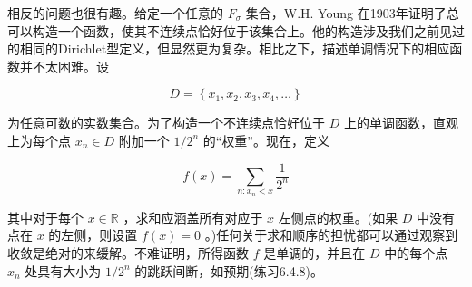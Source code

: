 相反的问题也很有趣。给定一个任意的 \({F}_{\sigma }\) 集合，W.H. Young 在1903年证明了总可以构造一个函数，使其不连续点恰好位于该集合上。他的构造涉及我们之前见过的相同的Dirichlet型定义，但显然更为复杂。相比之下，描述单调情况下的相应函数并不太困难。设

\[
D = \left\{  {{x}_{1},{x}_{2},{x}_{3},{x}_{4},\ldots }\right\}
\]

为任意可数的实数集合。为了构造一个不连续点恰好位于 \(D\) 上的单调函数，直观上为每个点 \({x}_{n} \in  D\) 附加一个 \(1/{2}^{n}\) 的“权重”。现在，定义

\[
f\left( x\right)  = \mathop{\sum }\limits_{{n : {x}_{n} < x}}\frac{1}{{2}^{n}}
\]

其中对于每个 \(x \in  \mathbb{R}\) ，求和应涵盖所有对应于 \(x\) 左侧点的权重。(如果 \(D\) 中没有点在 \(x\) 的左侧，则设置 \(f\left( x\right)  = 0\) 。)任何关于求和顺序的担忧都可以通过观察到收敛是绝对的来缓解。不难证明，所得函数 \(f\) 是单调的，并且在 \(D\) 中的每个点 \({x}_{n}\) 处具有大小为 \(1/{2}^{n}\) 的跳跃间断，如预期(练习6.4.8)。


